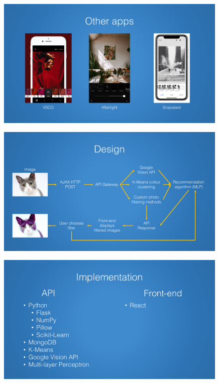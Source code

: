 \documentclass[a4paper,12pt]{report}
\begin{document}
\begin{appendices}
    \begin{figure}[h]
      \centering
      \includegraphics[width=0.9\linewidth]{presentation-5}
    \end{figure}

    \begin{figure}[h]
      \centering
      \includegraphics[width=0.9\linewidth]{presentation-6}
    \end{figure}

    \begin{figure}[h]
      \centering
      \includegraphics[width=0.9\linewidth]{presentation-7}
    \end{figure}


\end{appendices}
\end{document}
